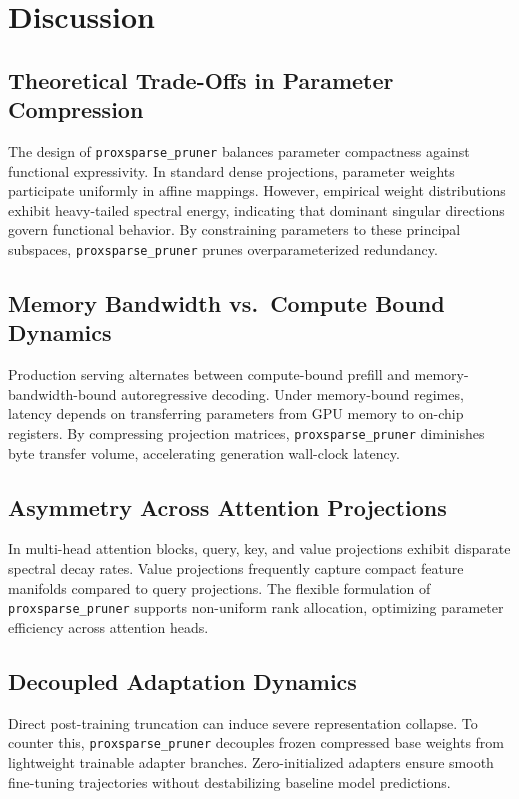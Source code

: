 \section{Discussion}

\subsection{Theoretical Trade-Offs in Parameter Compression}
The design of \texttt{proxsparse\_pruner} balances parameter compactness against functional expressivity. In standard dense projections, parameter weights participate uniformly in affine mappings. However, empirical weight distributions exhibit heavy-tailed spectral energy, indicating that dominant singular directions govern functional behavior. By constraining parameters to these principal subspaces, \texttt{proxsparse\_pruner} prunes overparameterized redundancy.

\subsection{Memory Bandwidth vs.\ Compute Bound Dynamics}
Production serving alternates between compute-bound prefill and memory-bandwidth-bound autoregressive decoding. Under memory-bound regimes, latency depends on transferring parameters from GPU memory to on-chip registers. By compressing projection matrices, \texttt{proxsparse\_pruner} diminishes byte transfer volume, accelerating generation wall-clock latency.

\subsection{Asymmetry Across Attention Projections}
In multi-head attention blocks, query, key, and value projections exhibit disparate spectral decay rates. Value projections frequently capture compact feature manifolds compared to query projections. The flexible formulation of \texttt{proxsparse\_pruner} supports non-uniform rank allocation, optimizing parameter efficiency across attention heads.

\subsection{Decoupled Adaptation Dynamics}
Direct post-training truncation can induce severe representation collapse. To counter this, \texttt{proxsparse\_pruner} decouples frozen compressed base weights from lightweight trainable adapter branches. Zero-initialized adapters ensure smooth fine-tuning trajectories without destabilizing baseline model predictions.

